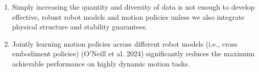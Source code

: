 \documentclass{propositions}
\begin{document}
\begin{enumerate}
    \item %
    Simply increasing the quantity and diversity of data is not enough to develop effective, robust robot models and motion policies unless we also integrate physical structure and stability guarantees.
    \item %
    Jointly learning motion policies across different robot models (i.e., cross embodiment policies) (O’Neill et al. 2024) significantly reduces the maximum achievable performance on highly dynamic motion tasks.

\end{enumerate}
\end{document}
